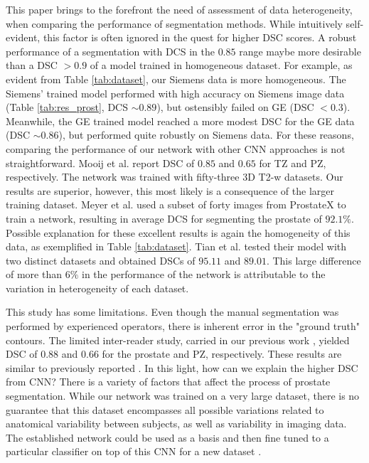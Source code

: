 This paper brings to the forefront the need of assessment of data heterogeneity, when comparing the performance of segmentation methods. While intuitively self-evident, this factor is often ignored in the quest for higher DSC scores. A robust performance of a segmentation with DCS in the $0.85$ range maybe more desirable than a DSC $> 0.9$ of a model trained in homogeneous dataset. For example, as evident from Table \ref{tab:dataset}, our Siemens data is more homogeneous. The Siemens' trained model performed with high accuracy on Siemens image data (Table \ref{tab:res_prost}, DCS $\sim 0.89$), but ostensibly failed on GE (DSC $< 0.3$). Meanwhile, the GE trained model reached a more modest DSC for the GE data (DSC $\sim 0.86$), but performed quite robustly on Siemens data. 
For these reasons, comparing the performance of our network with other CNN approaches is not straightforward. Mooij et al. \cite{mooij_automatic_2018} report DSC of $0.85$ and $0.65$ for TZ and PZ, respectively. The network was trained with fifty-three 3D T2-w datasets. Our results are superior, however, this most likely is a consequence of the larger training dataset. Meyer et al. \cite{anneke} used a subset of forty images from ProstateX to train a network, resulting in average DCS for segmenting the prostate of $92.1\%$. Possible explanation for these excellent results is again the homogeneity of this data, as exemplified in Table \ref{tab:dataset}. Tian et al. \cite{to2018deep} tested their model with two distinct datasets and obtained DSCs of $95.11$ and $89.01$. This large difference of more than $6\%$ in the performance of the network is attributable to the variation in heterogeneity of each dataset. 

This study has some limitations. Even though the manual segmentation was performed by experienced operators, there is inherent error in the "ground truth" contours. The limited inter-reader study, carried in our previous work \cite{deukwoo_classification_2018}, yielded DSC of $0.88$ and $0.66$ for the prostate and PZ, respectively. These results are similar to previously reported \cite{4_klein2008automatic}. In this light, how can we explain the higher DSC from CNN? There is a variety of factors that affect the process of prostate segmentation. While our network was trained on a very large dataset, there is no guarantee that this dataset encompasses all possible variations related to anatomical variability between subjects, as well as variability in imaging data. The established network could be used as a basis and then fine tuned to a particular classifier on top of this CNN for a new dataset \cite{tajbakhsh2016convolutional}.
	
